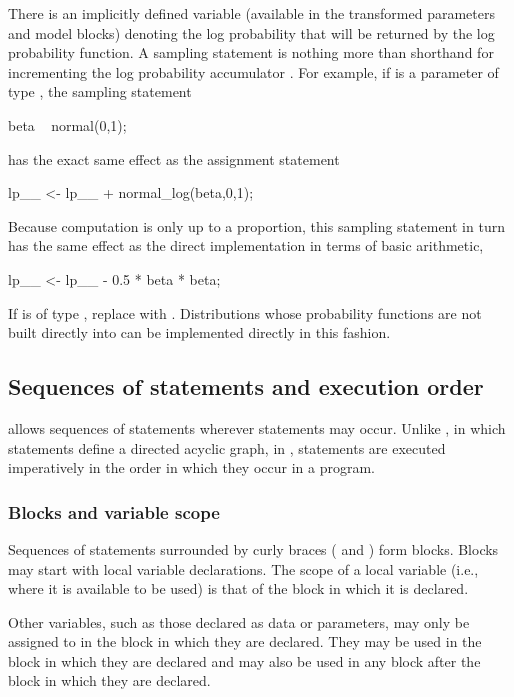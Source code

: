 \documentclass[article]{jss}
\begin{document}
There is an implicitly defined variable  (available in
the transformed parameters and model blocks) denoting the log
probability that will be returned by the log probability function.  A
sampling statement is nothing more than shorthand for incrementing the
log probability accumulator .  For example, if 
is a parameter of type , the sampling statement
%
\begin{Code}
beta ~ normal(0,1);
\end{Code}
%
has the exact same effect as the assignment statement
%
\begin{Code}
lp__ <- lp__ + normal_log(beta,0,1);
\end{Code}

Because computation is only up to a proportion, this sampling
statement in turn has the same effect as the direct implementation in
terms of basic arithmetic,
%
\begin{Code}
lp__ <- lp__ - 0.5 * beta * beta;
\end{Code}
%
If  is of type , replace 
with .  Distributions whose probability functions
are not built directly into  can be implemented
directly in this fashion.

\subsection{Sequences of statements and execution order}

 allows sequences of statements wherever statements may
occur. Unlike , in which statements define a directed
acyclic graph, in , statements are executed
imperatively in the order in which they occur in a program.

\subsubsection{Blocks and variable scope}

Sequences of statements surrounded by curly braces (\code{\{} and
\code{\}}) form blocks.  Blocks may start with local variable
declarations.  The scope of a local variable (i.e., where it is
available to be used) is that of the block in which it is declared.

Other variables, such as those declared as data or parameters, may
only be assigned to in the block in which they are declared.  They may
be used in the block in which they are declared and may also be used
in any block after the block in which they are declared.
\end{document}
